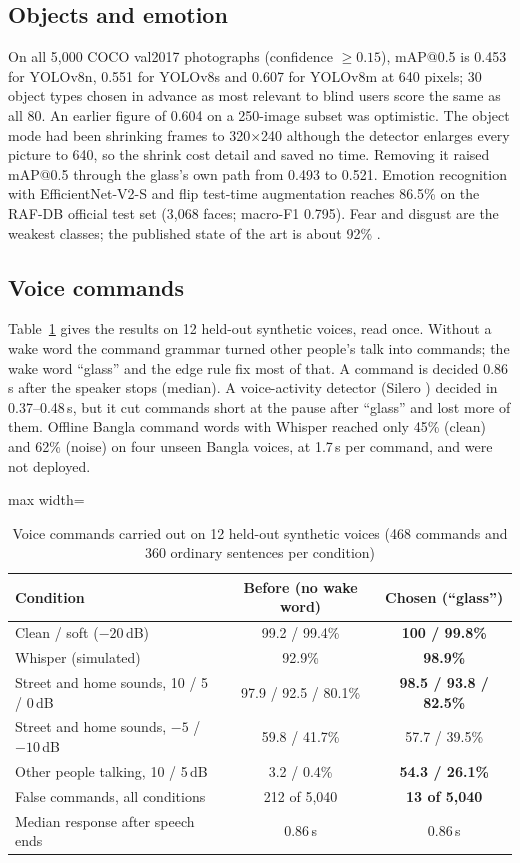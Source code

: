 \documentclass[preprint,12pt]{elsarticle}
\begin{document}
\subsection{Objects and emotion}
On all 5,000 COCO val2017 photographs (confidence $\ge0.15$), mAP@0.5 is 0.453 for YOLOv8n, 0.551 for YOLOv8s and 0.607 for YOLOv8m at 640 pixels; 30 object types chosen in advance as most relevant to blind users score the same as all 80. An earlier figure of 0.604 on a 250-image subset was optimistic. The object mode had been shrinking frames to 320$\times$240 although the detector enlarges every picture to 640, so the shrink cost detail and saved no time. Removing it raised mAP@0.5 through the glass's own path from 0.493 to 0.521. Emotion recognition with EfficientNet-V2-S and flip test-time augmentation reaches 86.5\% on the RAF-DB official test set (3,068 faces; macro-F1 0.795). Fear and disgust are the weakest classes; the published state of the art is about 92\% \cite{posterv2}.

\subsection{Voice commands}
Table~\ref{tab:voice} gives the results on 12 held-out synthetic voices, read once. Without a wake word the command grammar turned other people's talk into commands; the wake word ``glass'' and the edge rule fix most of that. A command is decided 0.86\,s after the speaker stops (median). A voice-activity detector (Silero \cite{silero}) decided in 0.37--0.48\,s, but it cut commands short at the pause after ``glass'' and lost more of them. Offline Bangla command words with Whisper reached only 45\% (clean) and 62\% (noise) on four unseen Bangla voices, at 1.7\,s per command, and were not deployed.

\begin{table}[!htbp]
\caption{Voice commands carried out on 12 held-out synthetic voices (468 commands and 360 ordinary sentences per condition)}
\label{tab:voice}
\centering\small
\begin{adjustbox}{max width=\textwidth}\begin{tabular}{@{}lcc@{}}
\toprule
Condition & Before (no wake word) & Chosen (``glass'') \\ \midrule
Clean / soft ($-20$\,dB) & 99.2 / 99.4\% & \textbf{100 / 99.8\%} \\
Whisper (simulated) & 92.9\% & \textbf{98.9\%} \\
Street and home sounds, 10 / 5 / 0\,dB & 97.9 / 92.5 / 80.1\% & \textbf{98.5 / 93.8 / 82.5\%} \\
Street and home sounds, $-5$ / $-10$\,dB & 59.8 / 41.7\% & 57.7 / 39.5\% \\
Other people talking, 10 / 5\,dB & 3.2 / 0.4\% & \textbf{54.3 / 26.1\%} \\
False commands, all conditions & 212 of 5,040 & \textbf{13 of 5,040} \\
Median response after speech ends & 0.86\,s & 0.86\,s \\ \bottomrule
\end{tabular}\end{adjustbox}
\end{table}
\end{document}
